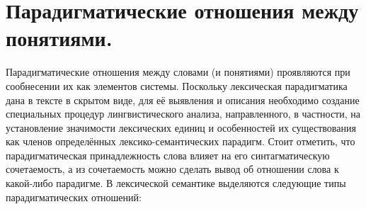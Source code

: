 \documentclass[12pt]{article}
\theoremstyle{definition}
\theoremstyle{remark}
\numberwithin{equation}{section}
\begin{document}
\section{Парадигматические отношения между понятиями.}
Парадигматические отношения между словами (и понятиями) проявляются при сообнесении их как элементов системы. Поскольку лексическая парадигматика дана в тексте в скрытом виде, для её выявления и описания необходимо создание специальных процедур лингвистического анализа, направленного, в частности, на установление значимости лексических единиц и особенностей их существования как членов определённых лексико-семантических парадигм. Стоит отметить, что парадигматическая принадлежность слова влияет на его синтагматическую сочетаемость, а из сочетаемость можно сделать вывод об отношении слова к какой-либо парадигме. В лексической семантике выделяются следующие типы парадигматических отношений:
\end{document}
